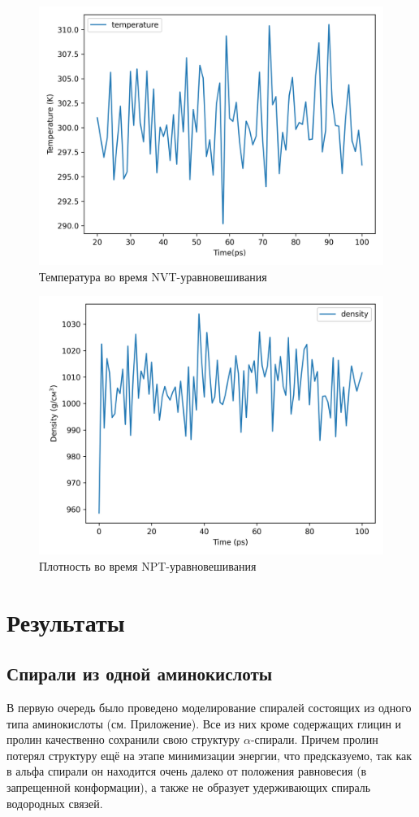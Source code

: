 \documentclass[
11pt,%
tightenlines,%
twoside,%
onecolumn,%
nofloats,%
nobibnotes,%
nofootinbib,%
superscriptaddress,%
noshowpacs,%
centertags]%
{revtex4}
\begin{document}
\begin{figure}[t]
	\centering
	\includegraphics[scale=0.7]{temperature}
	\caption{Температура во время NVT-уравновешивания}
\end{figure}
\begin{figure}[t]
	\centering
	\includegraphics[scale=0.7]{density}
	\caption{Плотность во время NPT-уравновешивания}
\end{figure}

\newpage

\section{Результаты}
\subsection{Спирали из одной аминокислоты}
В первую очередь было проведено моделирование спиралей состоящих из одного типа аминокислоты (см. Приложение).
Все из них кроме содержащих глицин и пролин качественно сохранили свою структуру $\alpha$-спирали.
Причем пролин потерял структуру ещё на этапе минимизации энергии,
что предсказуемо, так как в альфа спирали он находится очень далеко от положения равновесия 
(в запрещенной конформации), а также не образует удерживающих спираль водородных связей. \par
\end{document}
